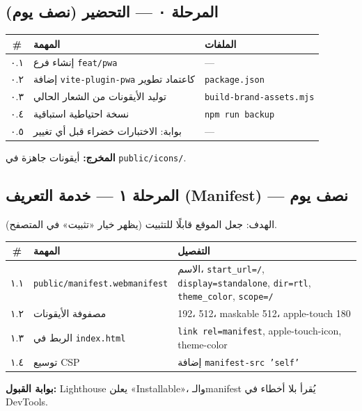 \documentclass[11pt]{article}
\newcommand{\code}[1]{\textcolor{darkbg}{\texttt{\small #1}}}
\begin{document}
\subsection{المرحلة ٠ — التحضير (نصف يوم)}
\begin{tabular}{@{}c p{6.5cm} p{5cm}@{}}
\toprule
\textbf{\#} & \textbf{المهمة} & \textbf{الملفات} \\
\midrule
٠.١ & إنشاء فرع \code{feat/pwa} & — \\
٠.٢ & إضافة \code{vite-plugin-pwa} كاعتماد تطوير & \code{package.json} \\
٠.٣ & توليد الأيقونات من الشعار الحالي & \code{build-brand-assets.mjs} \\
٠.٤ & نسخة احتياطية استباقية & \code{npm run backup} \\
٠.٥ & بوابة: الاختبارات خضراء قبل أي تغيير & — \\
\bottomrule
\end{tabular}
\begin{okbox}
\textbf{المخرج:} أيقونات جاهزة في \code{public/icons/}.
\end{okbox}

\subsection{المرحلة ١ — خدمة التعريف (Manifest) — نصف يوم}
الهدف: جعل الموقع قابلًا للتثبيت (يظهر خيار «تثبيت» في المتصفح).
\begin{tabular}{@{}c p{6.5cm} p{5cm}@{}}
\toprule
\textbf{\#} & \textbf{المهمة} & \textbf{التفصيل} \\
\midrule
١.١ & \code{public/manifest.webmanifest} & الاسم، \code{start\_url=/}, \code{display=standalone}, \code{dir=rtl}, \code{theme\_color}, \code{scope=/} \\
١.٢ & مصفوفة الأيقونات & 192، 512، maskable 512، apple-touch 180 \\
١.٣ & الربط في \code{index.html} & \code{link rel=manifest}, apple-touch-icon, theme-color \\
١.٤ & توسيع CSP & إضافة \code{manifest-src 'self'} \\
\bottomrule
\end{tabular}
\begin{okbox}
\textbf{بوابة القبول:} Lighthouse يعلن «Installable»، والـmanifest يُقرأ بلا أخطاء في DevTools.
\end{okbox}
\end{document}
